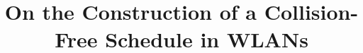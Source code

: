 \documentclass[journal]{IEEEtran}
\begin{document}
%
\title{On the Construction of a Collision-Free Schedule in WLANs}
%
%
%

\author{
}


% 
%
\end{document}
